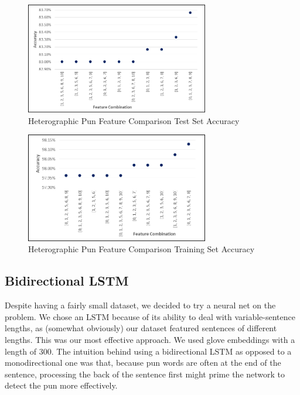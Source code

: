 \documentclass{article}
\begin{document}
\begin{figure}
  \centering
  \includegraphics[width=8cm]{figures/Accuracy_on_Test_Set_for_Heterographic_Pun.png}
  \caption{Heterographic Pun Feature Comparison Test Set Accuracy}\label{fig:ACC_Test_Hetero}
\end{figure}

\begin{figure}
  \centering
  \includegraphics[width=8cm]{figures/Accuracy_on_Training_Set_for_Heterographic_Pun.png}
  \caption{Heterographic Pun Feature Comparison Training Set Accuracy}\label{fig:ACC_Train_Hetero}
\end{figure}

\subsection{Bidirectional LSTM}

Despite having a fairly small dataset, we decided to try a neural net on the
problem. We chose an LSTM because of its ability to deal with variable-sentence
lengths, as (somewhat obviously) our dataset featured sentences of different
lengths. This was our most effective approach. We used glove embeddings with a
length of 300. The intuition behind using a bidirectional LSTM as opposed to a
monodirectional one was that, because pun words are often at the end of the
sentence, processing the back of the sentence first might prime the network to
detect the pun more effectively.

\end{document}
